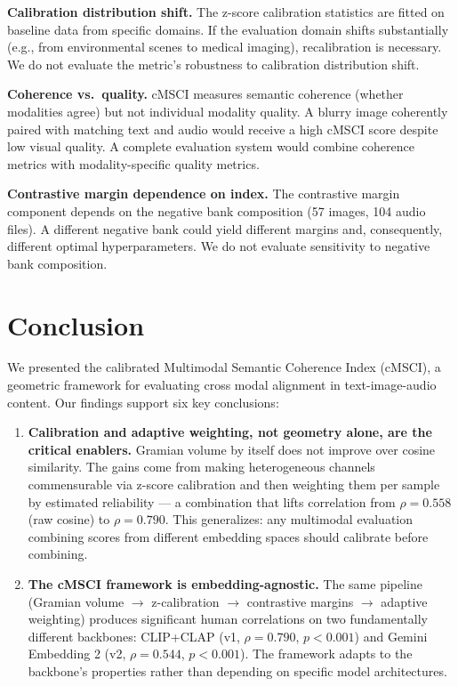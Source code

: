 \documentclass[a4paper,fleqn]{cas-sc}
\begin{document}
\begin{itemize}
\textbf{Calibration distribution shift.} The z-score calibration statistics are fitted on baseline data from specific domains. If the evaluation domain shifts substantially (e.g., from environmental scenes to medical imaging), recalibration is necessary. We do not evaluate the metric's robustness to calibration distribution shift.

\textbf{Coherence vs.\ quality.} cMSCI measures semantic coherence (whether modalities agree) but not individual modality quality. A blurry image coherently paired with matching text and audio would receive a high cMSCI score despite low visual quality. A complete evaluation system would combine coherence metrics with modality-specific quality metrics.

\textbf{Contrastive margin dependence on index.} The contrastive margin component depends on the negative bank composition (57 images, 104 audio files). A different negative bank could yield different margins and, consequently, different optimal hyperparameters. We do not evaluate sensitivity to negative bank composition.

\section{Conclusion}\label{sec:conclusion}

We presented the calibrated Multimodal Semantic Coherence Index (cMSCI), a geometric framework for evaluating cross modal alignment in text-image-audio content. Our findings support six key conclusions:

\begin{enumerate}
\item \textbf{Calibration and adaptive weighting, not geometry alone, are the critical enablers.} Gramian volume by itself does not improve over cosine similarity. The gains come from making heterogeneous channels commensurable via z-score calibration and then weighting them per sample by estimated reliability — a combination that lifts correlation from $\rho = 0.558$ (raw cosine) to $\rho = 0.790$. This generalizes: any multimodal evaluation combining scores from different embedding spaces should calibrate before combining.

\item \textbf{The cMSCI framework is embedding-agnostic.} The same pipeline (Gramian volume $\rightarrow$ z-calibration $\rightarrow$ contrastive margins $\rightarrow$ adaptive weighting) produces significant human correlations on two fundamentally different backbones: CLIP+CLAP (v1, $\rho = 0.790$, $p < 0.001$) and Gemini Embedding 2 (v2, $\rho = 0.544$, $p < 0.001$). The framework adapts to the backbone's properties rather than depending on specific model architectures.


\end{enumerate}
\end{itemize}
\end{document}
